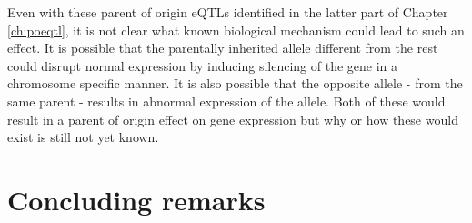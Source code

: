  Even with these parent of origin eQTLs identified in the latter part of Chapter \ref{ch:poeqtl}, it is not clear what known biological mechanism could lead to such an effect. It is possible that the parentally inherited allele different from the rest could disrupt normal expression by inducing silencing of the gene in a chromosome specific manner. It is also possible that the opposite allele - from the same parent - results in abnormal expression of the allele. Both of these would result in a parent of origin effect on gene expression but why or how these would exist is still not yet known. 

\section{Concluding remarks}




